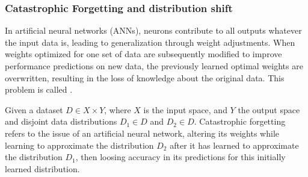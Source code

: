 \subsubsection{Catastrophic Forgetting and distribution shift}

In artificial neural networks (ANNs), neurons contribute to all outputs whatever the input data is, leading to generalization through weight adjustments.
When weights optimized for one set of data are subsequently modified to improve performance predictions on new data, the previously learned optimal weights are overwritten, resulting in the loss of knowledge about the original data.
This problem is called .

\begin{definition}
    Given a dataset $D \in X \times Y$, where $X$ is the input space, and $Y$ the output space and disjoint data
    distributions $D_1 \in D$ and $D_2 \in D$.
    Catastrophic forgetting refers to the issue of an artificial neural network, altering its weights while learning to
    approximate the distribution $D_2$ after it has learned to approximate the distribution $D_1$, then loosing accuracy
    in its predictions for this initially learned distribution. %
\end{definition}

